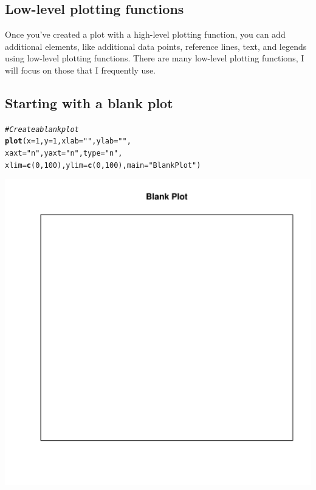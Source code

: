 \documentclass{tufte-book}\usepackage[]{graphicx}\usepackage[]{color}
\makeatletter
\def\maxwidth{ %
  \ifdim\Gin@nat@width>\linewidth
    \linewidth
  \else
    \Gin@nat@width
  \fi
}
\newcommand{\hlnum}[1]{\textcolor[rgb]{0.686,0.059,0.569}{#1}}%
\newcommand{\hlstr}[1]{\textcolor[rgb]{0.192,0.494,0.8}{#1}}%
\newcommand{\hlcom}[1]{\textcolor[rgb]{0.678,0.584,0.686}{\textit{#1}}}%
\newcommand{\hlstd}[1]{\textcolor[rgb]{0.345,0.345,0.345}{#1}}%
\newcommand{\hlkwc}[1]{\textcolor[rgb]{0.333,0.667,0.333}{#1}}%
\newcommand{\hlkwd}[1]{\textcolor[rgb]{0.737,0.353,0.396}{\textbf{#1}}}%
\newenvironment{kframe}{%
 \def\at@end@of@kframe{}%
 \ifinner\ifhmode%
  \def\at@end@of@kframe{\end{minipage}}%
  \begin{minipage}{\columnwidth}%
 \fi\fi%
 \def\FrameCommand##1{\hskip\@totalleftmargin \hskip-\fboxsep
 \colorbox{shadecolor}{##1}\hskip-\fboxsep
     \hskip-\linewidth \hskip-\@totalleftmargin \hskip\columnwidth}%
 \MakeFramed {\advance\hsize-\width
   \@totalleftmargin\z@ \linewidth\hsize
   \@setminipage}}%
 {\par\unskip\endMakeFramed%
 \at@end@of@kframe}
\newenvironment{knitrout}{}{} %
\makeatother
\begin{document}
\begin{footnotesize}
\section{Low-level plotting functions}

Once you've created a plot with a high-level plotting function, you can add additional elements, like additional data points, reference lines, text, and legends using low-level plotting functions. There are many low-level plotting functions, I will focus on those that I frequently use.

\subsection{Starting with a blank plot}


\begin{marginfigure}
\begin{tiny}
\begin{knitrout}
\color{fgcolor}\begin{kframe}
\begin{alltt}
\hlcom{# Create a blank plot}
\hlkwd{plot}\hlstd{(}\hlkwc{x} \hlstd{=} \hlnum{1}\hlstd{,} \hlkwc{y} \hlstd{=} \hlnum{1}\hlstd{,} \hlkwc{xlab} \hlstd{=} \hlstr{""}\hlstd{,} \hlkwc{ylab} \hlstd{=} \hlstr{""}\hlstd{,}
     \hlkwc{xaxt} \hlstd{=} \hlstr{"n"}\hlstd{,} \hlkwc{yaxt} \hlstd{=} \hlstr{"n"}\hlstd{,} \hlkwc{type} \hlstd{=} \hlstr{"n"}\hlstd{,}
     \hlkwc{xlim} \hlstd{=} \hlkwd{c}\hlstd{(}\hlnum{0}\hlstd{,} \hlnum{100}\hlstd{),} \hlkwc{ylim} \hlstd{=} \hlkwd{c}\hlstd{(}\hlnum{0}\hlstd{,} \hlnum{100}\hlstd{),} \hlkwc{main} \hlstd{=} \hlstr{"Blank Plot"}\hlstd{)}
\end{alltt}
\end{kframe}
\includegraphics[width=\maxwidth]{figure/unnamed-chunk-150-1} 


\end{knitrout}
\end{tiny}
\end{marginfigure}
\end{footnotesize}
\end{document}
